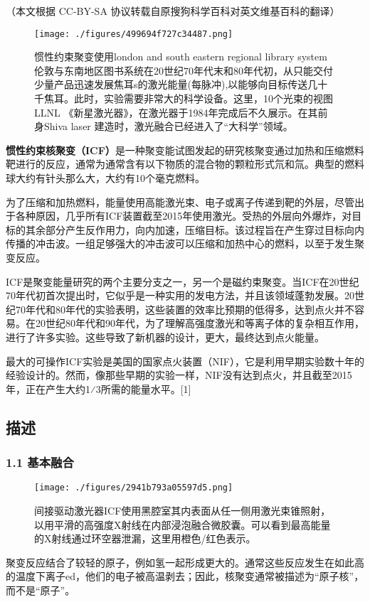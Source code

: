 
（本文根据 CC-BY-SA 协议转载自原搜狗科学百科对英文维基百科的翻译）

\begin{figure}[ht]
\centering
\texttt{[image: ./figures/499694f727c34487.png]}
\caption{惯性约束聚变使用london and south eastern regional library system 伦敦与东南地区图书系统在20世纪70年代末和80年代初，从只能交付少量产品迅速发展焦耳s的激光能量(每脉冲),以能够向目标传送几十千焦耳。此时，实验需要非常大的科学设备。这里，10个光束的视图LLNL 《新星激光器》，在激光器于1984年完成后不久展示。在其前身Shiva laser 建造时，激光融合已经进入了“大科学”领域。} \label{fig_GXYS_7}
\end{figure}
\textbf{惯性约束核聚变（ICF）}是一种聚变能试图发起的研究核聚变通过加热和压缩燃料靶进行的反应，通常为通常含有以下物质的混合物的颗粒形式氘和氚。典型的燃料球大约有针头那么大，大约有10个毫克燃料。

为了压缩和加热燃料，能量使用高能激光束、电子或离子传递到靶的外层，尽管出于各种原因，几乎所有ICF装置截至2015年使用激光。受热的外层向外爆炸，对目标的其余部分产生反作用力，向内加速，压缩目标。该过程旨在产生穿过目标向内传播的冲击波。一组足够强大的冲击波可以压缩和加热中心的燃料，以至于发生聚变反应。

ICF是聚变能量研究的两个主要分支之一，另一个是磁约束聚变。当ICF在20世纪70年代初首次提出时，它似乎是一种实用的发电方法，并且该领域蓬勃发展。20世纪70年代和80年代的实验表明，这些装置的效率比预期的低得多，达到点火并不容易。在20世纪80年代和90年代，为了理解高强度激光和等离子体的复杂相互作用，进行了许多实验。这些导致了新机器的设计，更大，最终达到点火能量。

最大的可操作ICF实验是美国的国家点火装置（NIF），它是利用早期实验数十年的经验设计的。然而，像那些早期的实验一样，NIF没有达到点火，并且截至2015年，正在产生大约1⁄3所需的能量水平。[1]

\subsection{描述}
\subsubsection{1.1 基本融合}
\begin{figure}[ht]
\centering
\texttt{[image: ./figures/2941b793a05597d5.png]}
\caption{间接驱动激光器ICF使用黑腔室其内表面从任一侧用激光束锥照射，以用平滑的高强度X射线在内部浸泡融合微胶囊。可以看到最高能量的X射线通过环空器泄漏，这里用橙色/红色表示。} \label{fig_GXYS_1}
\end{figure}
聚变反应结合了较轻的原子，例如氢一起形成更大的。通常这些反应发生在如此高的温度下离子ed，他们的电子被高温剥去；因此，核聚变通常被描述为“原子核”，而不是“原子”。

